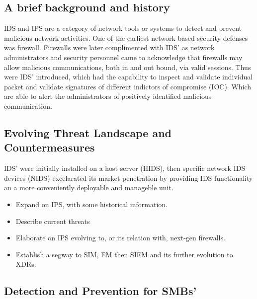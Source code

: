 
\subsection{A brief background and history}

IDS and IPS are a category of network tools or systems to detect and prevent malicious network activities. One of the earliest network based security defenses was firewall. Firewalls were later complimented with IDS' as network administrators and security personnel came to acknowledge that firewalls may allow malicious  communications, both in and out bound, via valid sessions. Thus were IDS' introduced, which had the capability to inspect and validate individual packet and validate signatures of different indictors of compromise (IOC). Which are able to alert the administrators of positively identified malicious communication.

\subsection{Evolving Threat Landscape and Countermeasures}

IDS' were initially installed on a host server (HIDS), then specific network IDS devices (NIDS) excelarated its market penetration by providing IDS functionality an a more conveniently deployable and manageble unit.

\begin{followup}[to-do]
    \begin{itemize}
        \item Expand on IPS, with some historical information.
        \item Describe current threats
        \item Elaborate on IPS evolving to, or its relation with, next-gen firewalls.
        \item Establish a segway to SIM, EM then SIEM and its further evolution to XDRs.
    \end{itemize}
\end{followup}

\subsection{Detection and Prevention for SMBs'}

